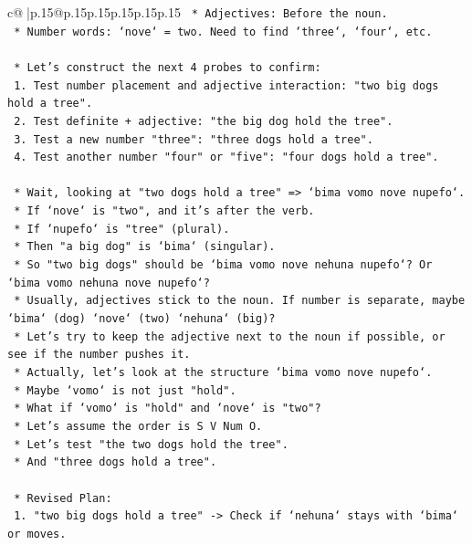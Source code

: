 \documentclass{article}
\begin{document}
{\begin{supertabular}{c@{$\;$}|p{.15\linewidth}@{}p{.15\linewidth}p{.15\linewidth}p{.15\linewidth}p{.15\linewidth}p{.15\linewidth}}
{{{\texttt{        *   Adjectives: Before the noun.} \\
\texttt{        *   Number words: `nove` = two. Need to find `three`, `four`, etc.} \\
\\ 
\texttt{    *   Let's construct the next 4 probes to confirm:} \\
\texttt{        1.  Test number placement and adjective interaction: "two big dogs hold a tree".} \\
\texttt{        2.  Test definite + adjective: "the big dog hold the tree".} \\
\texttt{        3.  Test a new number "three": "three dogs hold a tree".} \\
\texttt{        4.  Test another number "four" or "five": "four dogs hold a tree".} \\
\\ 
\texttt{    *   Wait, looking at "two dogs hold a tree" => `bima vomo nove nupefo`.} \\
\texttt{        *   If `nove` is "two", and it's after the verb.} \\
\texttt{        *   If `nupefo` is "tree" (plural).} \\
\texttt{        *   Then "a big dog" is `bima` (singular).} \\
\texttt{        *   So "two big dogs" should be `bima vomo nove nehuna nupefo`? Or `bima vomo nehuna nove nupefo`?} \\
\texttt{        *   Usually, adjectives stick to the noun. If number is separate, maybe `bima` (dog) `nove` (two) `nehuna` (big)?} \\
\texttt{        *   Let's try to keep the adjective next to the noun if possible, or see if the number pushes it.} \\
\texttt{        *   Actually, let's look at the structure `bima vomo nove nupefo`.} \\
\texttt{        *   Maybe `vomo` is not just "hold".} \\
\texttt{        *   What if `vomo` is "hold" and `nove` is "two"?} \\
\texttt{        *   Let's assume the order is S V Num O.} \\
\texttt{        *   Let's test "the two dogs hold the tree".} \\
\texttt{        *   And "three dogs hold a tree".} \\
\\ 
\texttt{    *   Revised Plan:} \\
\texttt{        1.  "two big dogs hold a tree" {-}> Check if `nehuna` stays with `bima` or moves.} \\
}}}
\end{supertabular}}
\end{document}
